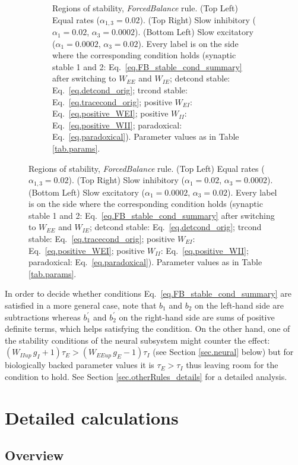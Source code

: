 \documentclass[twocolumn]{article}
\newcommand{\EE}{\mathit{EE}}
\newcommand{\EI}{\mathit{EI}}
\newcommand{\IE}{\mathit{IE}}
\newcommand{\II}{\mathit{II}}
\newcommand{\up}{\mathit{up}}
\begin{document}
\begin{figure}[!ht]
{\begin{figure}[H]
\caption{Regions of stability, {\em ForcedBalance} rule. (Top Left) Equal rates ($\alpha_{1,3}=0.02$). (Top Right) Slow inhibitory ($\alpha_1=0.02$, $\alpha_3=0.0002$). (Bottom Left) Slow excitatory ($\alpha_1=0.0002$, $\alpha_3=0.02$). Every label is on the side where the  corresponding  condition  holds (synaptic stable 1 and 2: Eq.\ \ref{eq.FB_stable_cond_summary} after switching to $W_{\EE}$ and $W_{\IE}$; detcond stable: Eq.\ \ref{eq.detcond_orig}; trcond stable: Eq.\ \ref{eq.tracecond_orig}; positive $W_{\EI}$: Eq.\ \ref{eq.positive_WEI}; positive $W_{\II}$: Eq.\ \ref{eq.positive_WII}; paradoxical: Eq.\ \ref{eq.paradoxical}). Parameter values as in Table \ref{tab.params}.}
\label{fig.FB_stability}
\end{figure}}
\end{figure}




In order to decide whether conditions Eq.\ \ref{eq.FB_stable_cond_summary} are satisfied in a more general case, note that $b_1$ and $b_2$ on the left-hand side are subtractions whereas $b_1^\prime$ and $b_2^\prime$ on the right-hand side are sums of positive definite terms, which helps satisfying the condition. On the other hand, one of the stability conditions of the neural subsystem might counter the effect: $(W_{\II\up} \, g_I + 1)\tau_E > (W_{\EE\up} \, g_E - 1)\tau_I$ (see Section \ref{sec.neural} below) but for biologically backed parameter values it is $\tau_E > \tau_I$ thus leaving room for the condition to hold. See Section \ref{sec.otherRules_details} for a detailed analysis.




\section{Detailed calculations}
\label{sec.Details}

\subsection{Overview}
\end{document}
